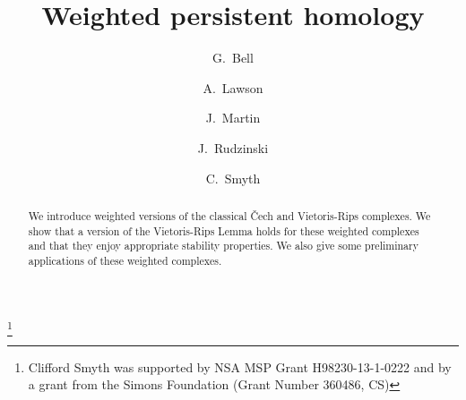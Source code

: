 \documentclass{amsart}
\newtheorem*{fibering lemma}{Fibering Lemma}
\newtheorem*{decomposition lemma}{Decomposition Lemma}
\newtheorem*{hurewicz theorem}{Hurewicz Theorem}
\theoremstyle{definition}
\begin{document}


\title[Weighted persistent homology]{Weighted persistent homology}
\author{G.~Bell}
\address{Department of Mathematics and Statistics, The University of North Carolina at Greensboro, Greensboro, NC 27402, USA} 

\author{A.~Lawson}
\address{Department of Mathematics and Statistics, The University of North Carolina at Greensboro, Greensboro, NC 27402, USA} 

\author{J.~Martin}
\address{Department of Mathematics and Statistics, The University of North Carolina at Greensboro, Greensboro, NC 27402, USA} 

\author{J.~Rudzinski}
\address{Department of Mathematics and Statistics, The University of North Carolina at Greensboro, Greensboro, NC 27402, USA} 

\author{C.~Smyth }
\address{Department of Mathematics and Statistics, The University of North Carolina at Greensboro, Greensboro, NC 27402, USA} 
\thanks{Clifford Smyth was supported by NSA MSP Grant H98230-13-1-0222 and by a grant from the Simons Foundation (Grant Number 360486, CS)}
\begin{abstract}
We introduce weighted versions of the classical \v{C}ech and Vietoris-Rips complexes. We show that a version of the Vietoris-Rips Lemma holds for these weighted complexes and that they enjoy appropriate stability properties. We also give some preliminary applications of these weighted complexes.
\end{abstract}

\maketitle
\end{document}
